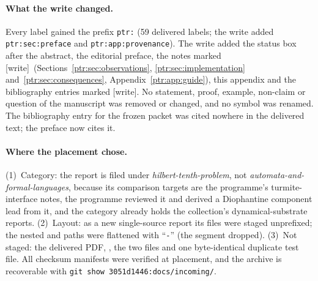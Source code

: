 \documentclass[11pt,letterpaper]{article}
\theoremstyle{definition}\newtheorem{definition}[theorem]{Definition}
\theoremstyle{remark}\newtheorem{remark}[theorem]{Remark}
\newcommand{\wtag}{\textup{[write]}}
\begin{document}
\paragraph{What the write changed.} Every label gained the prefix
\texttt{ptr:} (59 delivered labels; the write added
\texttt{ptr:sec:preface} and \texttt{ptr:app:provenance}). The write added
the status box after the abstract, the editorial preface, the notes
marked \wtag\ (Sections~\ref{ptr:sec:observations},
\ref{ptr:sec:implementation} and~\ref{ptr:sec:consequences},
Appendix~\ref{ptr:app:guide}), this appendix and the bibliography entries
marked \wtag. No statement, proof, example, non-claim or question of the
manuscript was removed or changed, and no symbol was renamed. The bibliography
entry for the frozen packet was cited nowhere in the delivered text; the
preface now cites it.

\paragraph{Where the placement chose.} (1)~Category: the report is filed
under \emph{hilbert-tenth-problem}, not \emph{automata-and-formal-languages},
because its comparison targets are the programme's turmite-interface notes,
the programme reviewed it and derived a Diophantine component lead from it,
and the category already holds the collection's dynamical-substrate reports.
(2)~Layout: as a new single-source report its files were staged unprefixed;
the nested  and  paths were
flattened with ``\texttt{-}'' (the segment  dropped).
(3)~Not staged: the delivered PDF, , the two
 files and one byte-identical duplicate test
file. All checksum manifests were verified at placement, and the archive is
recoverable with
\texttt{git show 3051d1446:docs/incoming/}\allowbreak{}.
\end{document}
